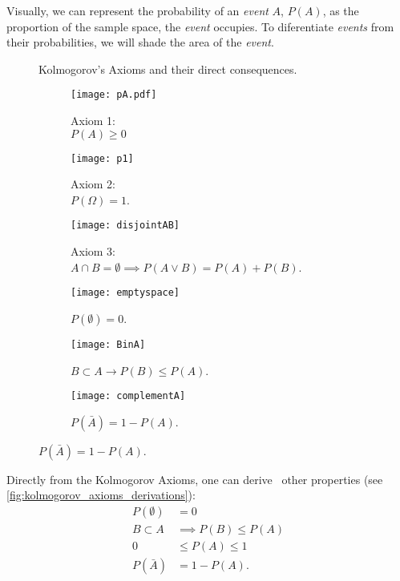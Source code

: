 Visually, we can represent the probability of an \emph{event} \(A\), \(P(A)\), as the proportion of the sample space, the \emph{event} occupies. To diferentiate \emph{events} from their probabilities, we will shade the area of the \emph{event}.
\begin{figure}[ht!]
\captionsetup[subfigure]{labelformat=empty}
\begin{sidecaption}{Kolmogorov's Axioms and their direct consequences.}\label{fig:kolmogorov_axioms}
\centering
\begin{subfigure}[t]{.3\textwidth}\centering\texttt{[image: pA.pdf]}
	\caption{Axiom 1: \\\(P(A)\geq 0\)}\label{fig:axiom1}
\end{subfigure}
\hfill
\begin{subfigure}[t]{.3\textwidth} \centering\texttt{[image: p1]}
	\caption{Axiom 2:\\\(P(\Omega)=1\).}\label{fig:axiom2}
\end{subfigure}
\hfill
\begin{subfigure}[t]{.3\textwidth} \centering\texttt{[image: disjointAB]}
	\caption{Axiom 3: \(A \cap B = \emptyset \implies P(A \lor B)=P(A)+P(B)\).}\label{fig:axiom3}
\end{subfigure}
\hfill
\begin{subfigure}
[t]{.3
\textwidth} \centering
\texttt{[image: emptyspace]}
\caption{\(P(\emptyset)=0\).}
\end{subfigure}
\hfill
\begin{subfigure}
[t]{.3
\textwidth} \centering
\texttt{[image: BinA]}
\caption{\(B\subset A \to P(B) \leq P(A)\).}
\end{subfigure}
\hfill
\begin{subfigure}
[t]{.3
\textwidth} \centering
\texttt{[image: complementA]}
\caption{\(P(\bar{A})=1-P(A)\).}
\end{subfigure}
\end{sidecaption}
\end{figure}

Directly from the Kolmogorov Axioms, one can derive~\cite{jaynes:2003} other properties (see \cref{fig:kolmogorov_axioms_derivations}):
\begin{align}
P(\emptyset)&=0\\
B \subset A &\implies P(B) \leq P(A)\\
0 &\leq P(A) \leq 1\\
P(\bar{A})&=1-P(A).
\end{align}




